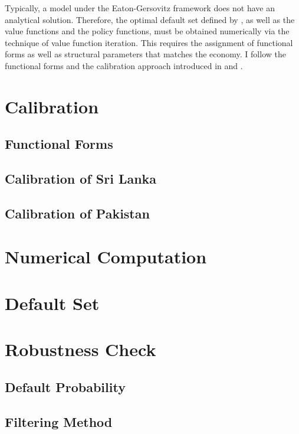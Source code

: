 Typically, a model under the Eaton-Gersovitz framework does not have an analytical solution. Therefore, the optimal default set defined by , as well as the value functions and the policy functions, must be obtained numerically via the technique of value function iteration.
This requires the assignment of functional forms as well as structural parameters that matches the economy.
I follow the functional forms and the calibration approach introduced in \citet{Na-18} and \citet{Hinrichsen_2020-chapter4}.

\section{Calibration}
\label{sec: calibration}

\subsection{Functional Forms}


\subsection{Calibration of Sri Lanka}


\subsection{Calibration of Pakistan}


\section{Numerical Computation}
\label{sec:computation}


\section{Default Set}
\label{sec: default-set}


\section{Robustness Check}

\subsection{Default Probability}


\subsection{Filtering Method}
